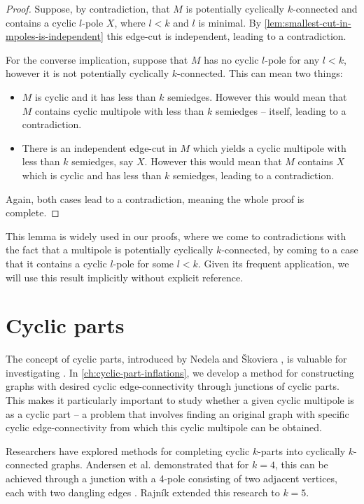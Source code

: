 \documentclass[12pt, twoside]{book}
\begin{document}
\begin{proof}
	Suppose, by contradiction, that $M$ is potentially cyclically $k$-connected and contains a cyclic \mbox{$l$-pole} $X$, where $l<k$ and $l$ is minimal. By \cref{lem:smallest-cut-in-mpoles-is-independent} this edge-cut is independent, leading to a contradiction.
	
	For the converse implication, suppose that $M$ has no cyclic $l$-pole for any $l<k$, however it is not potentially cyclically $k$-connected. This can mean two things:
	\begin{itemize}
		\item $M$ is cyclic and it has less than $k$ semiedges. However this would mean that $M$ contains cyclic multipole with less than $k$ semiedges -- itself, leading to a contradiction.
		\item There is an independent edge-cut in $M$ which yields a cyclic multipole with less than $k$ semiedges, say $X$. However this would mean that $M$ contains $X$ which is cyclic and has less than $k$ semiedges, leading to a contradiction.
	\end{itemize}
	
	Again, both cases lead to a contradiction, meaning the whole proof is complete.
\end{proof}

This lemma is widely used in our proofs, where we come to contradictions with the fact that a multipole is potentially cyclically $k$-connected, by coming to a case that it contains a cyclic $l$-pole for some $l<k$. Given its frequent application, we will use this result implicitly without explicit reference.

\section{Cyclic parts}\label{sec:cyclic-part-results}

The concept of cyclic parts, introduced by Nedela and Škoviera \cite{atoms-of-cyclic}, is valuable for investigating . In \cref{ch:cyclic-part-inflations}, we develop a method for constructing graphs with desired cyclic edge-connectivity through junctions of cyclic parts. This makes it particularly important to study whether a given cyclic multipole is as a cyclic part -- a problem that involves finding an original graph with specific cyclic edge-connectivity from which this cyclic multipole can be obtained.

Researchers have explored methods for completing cyclic $k$-parts into cyclically $k$-connected graphs. Andersen et al. \cite{Andersen1988} demonstrated that for $k=4$, this can be achieved through a junction with a 4-pole consisting of two adjacent vertices, each with two dangling edges \cite[Lemma 7]{Andersen1988}. Rajník \cite{Rajnik_phd} extended this research to $k=5$.
\end{document}
